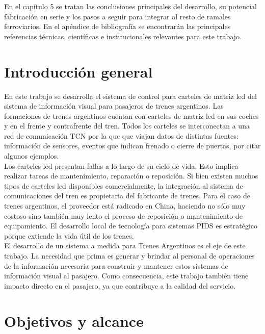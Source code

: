 En el capítulo 5 se tratan las conclusiones principales del desarrollo, su potencial fabricación en serie y los pasos a seguir para integrar al resto de ramales ferroviarios. En el apéndice de bibliografía se encontrarán las principales referencias técnicas, científicas e institucionales relevantes para este trabajo.\\


\pagebreak
\section{Introducción general}
En este trabajo se desarrolla el sistema de control para carteles de matriz led del sistema de información visual para pasajeros de trenes argentinos. Las formaciones de trenes argentinos cuentan con carteles de matriz led en sus coches y en el frente y contrafrente del tren. Todos los carteles se interconectan a una red de comunicación TCN por la que que viajan datos de distintas fuentes: información de sensores, eventos que indican frenado o cierre de puertas, por citar algunos ejemplos. \\

Los carteles led presentan fallas a lo largo de su ciclo de vida. Esto implica realizar tareas de mantenimiento, reparación o reposición. Si bien existen muchos tipos de carteles led disponibles comercialmente, la integración al sistema de comunicaciones del tren es propietaria del fabricante de trenes. Para el caso de trenes argentinos, el proveedor está radicado en China, haciendo no sólo muy costoso sino también muy lento el proceso de reposición o mantenimiento de equipamiento. El desarrollo local de tecnología para sistemas PIDS es estratégico porque extiende la vida útil de los trenes.\\


El desarrollo de un sistema a medida para Trenes Argentinos es el eje de este trabajo. La necesidad que prima es generar y brindar al personal de operaciones de la información necesaria para construir y mantener estos sistemas de información visual al pasajero. Como consecuencia, este trabajo también tiene impacto directo en el pasajero, ya que contribuye a la calidad del servicio.\\


\pagebreak
\section{Objetivos y alcance}

